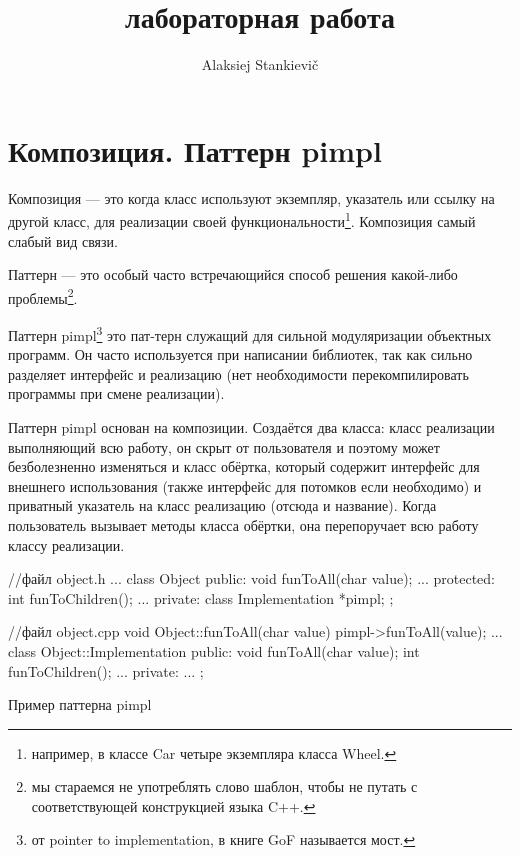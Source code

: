 \documentclass[12pt]{article}
\author{Alaksiej Stankievič}
\title{лабораторная работа}
\begin{document}

\section{Композиция. Паттерн pimpl}
Композиция --- это когда класс используют экземпляр, указатель или ссылку на другой класс, для реализации своей 
функциональности\footnote{например, в классе Car четыре экземпляра класса Wheel.}. Композиция самый слабый вид связи. 

Паттерн --- это особый часто встречающийся способ решения какой-либо проблемы\footnote{мы стараемся не употреблять 
слово шаблон, чтобы не путать с соответствующей конструкцией языка C++.}.

Паттерн pimpl\footnote{от pointer to implementation, в книге GoF называется мост.} это пат-терн служащий для сильной 
модуляризации объектных программ. Он часто используется при написании библиотек, так как сильно разделяет интерфейс и 
реализацию (нет необходимости перекомпилировать программы при смене реализации). 

Паттерн pimpl основан на композиции. Создаётся два класса: класс реализации выполняющий всю работу, он скрыт от 
пользователя и поэтому может безболезненно изменяться и класс обёртка, который содержит интерфейс для внешнего 
использования (также интерфейс для потомков если необходимо) и приватный указатель на класс реализацию (отсюда и 
название). Когда пользователь вызывает методы класса обёртки, она перепоручает всю работу классу реализации.

\begin{listing}[H]
\begin{center}
\begin{cppcode}
//файл object.h
...
class Object
{
public:
    void funToAll(char value);
    ...
protected:
    int funToChildren();
    ...
private:
    class Implementation *pimpl;
};

//файл object.cpp
void Object::funToAll(char value)
{
    pimpl->funToAll(value);
}
...
class Object::Implementation
{
public:
    void funToAll(char value);
    int funToChildren();
    ...
private:
    ...
};
\end{cppcode}
\end{center}
\caption{Пример паттерна pimpl}
\label{lst:pimpl}
\end{listing}
\end{document}
